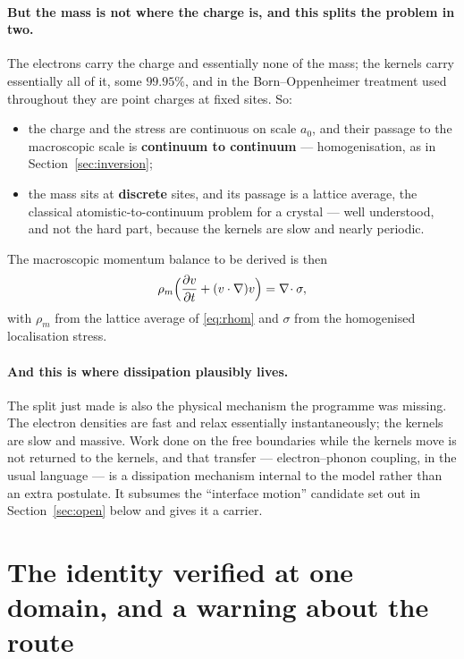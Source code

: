 \documentclass[11pt]{article}
\newcommand{\grad}{\nabla}
\begin{document}
\paragraph{But the mass is not where the charge is, and this splits the problem in two.} The
electrons carry the charge and essentially none of the mass; the kernels carry essentially all of
it, some $99.95\%$, and in the Born--Oppenheimer treatment used throughout they are point charges at
fixed sites. So:
\begin{itemize}\itemsep3pt
\item the charge and the stress are continuous on scale $a_0$, and their passage to the macroscopic
scale is \textbf{continuum to continuum} --- homogenisation, as in Section~\ref{sec:inversion};
\item the mass sits at \textbf{discrete} sites, and its passage is a lattice average, the
classical atomistic-to-continuum problem for a crystal --- well understood, and not the hard part,
because the kernels are slow and nearly periodic.
\end{itemize}
The macroscopic momentum balance to be derived is then
\begin{equation}\label{eq:macro}
\rho_m\Bigl(\frac{\partial v}{\partial t}+(v\cdot\grad)v\Bigr)=\grad\!\cdot\sigma ,
\end{equation}
with $\rho_m$ from the lattice average of \eqref{eq:rhom} and $\sigma$ from the homogenised
localisation stress.

\paragraph{And this is where dissipation plausibly lives.} The split just made is also the physical
mechanism the programme was missing. The electron densities are fast and relax essentially
instantaneously; the kernels are slow and massive. Work done on the free boundaries while the
kernels move is not returned to the kernels, and that transfer --- electron--phonon coupling, in the
usual language --- is a dissipation mechanism internal to the model rather than an extra postulate.
It subsumes the ``interface motion'' candidate set out in Section~\ref{sec:open} below and gives it a carrier.

\section{The identity verified at one domain, and a warning about the route}\label{sec:phase1}
\end{document}
